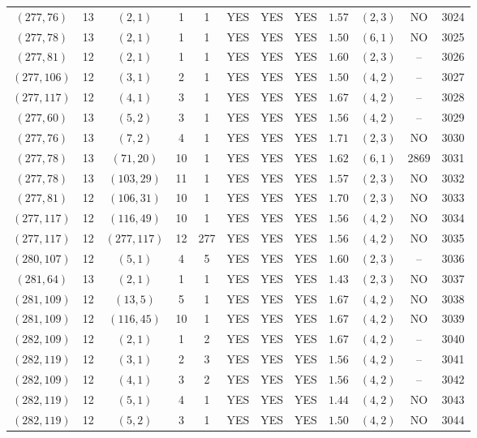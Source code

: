 \begin{longtable}{|c|c|c|c|c|c|c|c|c|c|c|c|}
$(277,76)$ & 13 & $(2,1)$ & 1 & 1 & YES & YES & YES & $1.57$ & $(2,3)$ & NO & 3024\\
$(277,78)$ & 13 & $(2,1)$ & 1 & 1 & YES & YES & YES & $1.50$ & $(6,1)$ & NO & 3025\\
$(277,81)$ & 12 & $(2,1)$ & 1 & 1 & YES & YES & YES & $1.60$ & $(2,3)$ & -- & 3026\\
$(277,106)$ & 12 & $(3,1)$ & 2 & 1 & YES & YES & YES & $1.50$ & $(4,2)$ & -- & 3027\\
$(277,117)$ & 12 & $(4,1)$ & 3 & 1 & YES & YES & YES & $1.67$ & $(4,2)$ & -- & 3028\\
$(277,60)$ & 13 & $(5,2)$ & 3 & 1 & YES & YES & YES & $1.56$ & $(4,2)$ & -- & 3029\\
$(277,76)$ & 13 & $(7,2)$ & 4 & 1 & YES & YES & YES & $1.71$ & $(2,3)$ & NO & 3030\\
$(277,78)$ & 13 & $(71,20)$ & 10 & 1 & YES & YES & YES & $1.62$ & $(6,1)$ & 2869 & 3031\\
$(277,78)$ & 13 & $(103,29)$ & 11 & 1 & YES & YES & YES & $1.57$ & $(2,3)$ & NO & 3032\\
$(277,81)$ & 12 & $(106,31)$ & 10 & 1 & YES & YES & YES & $1.70$ & $(2,3)$ & NO & 3033\\
$(277,117)$ & 12 & $(116,49)$ & 10 & 1 & YES & YES & YES & $1.56$ & $(4,2)$ & NO & 3034\\
$(277,117)$ & 12 & $(277,117)$ & 12 & 277 & YES & YES & YES & $1.56$ & $(4,2)$ & NO & 3035\\
$(280,107)$ & 12 & $(5,1)$ & 4 & 5 & YES & YES & YES & $1.60$ & $(2,3)$ & -- & 3036\\
$(281,64)$ & 13 & $(2,1)$ & 1 & 1 & YES & YES & YES & $1.43$ & $(2,3)$ & NO & 3037\\
$(281,109)$ & 12 & $(13,5)$ & 5 & 1 & YES & YES & YES & $1.67$ & $(4,2)$ & NO & 3038\\
$(281,109)$ & 12 & $(116,45)$ & 10 & 1 & YES & YES & YES & $1.67$ & $(4,2)$ & NO & 3039\\
$(282,109)$ & 12 & $(2,1)$ & 1 & 2 & YES & YES & YES & $1.67$ & $(4,2)$ & -- & 3040\\
$(282,119)$ & 12 & $(3,1)$ & 2 & 3 & YES & YES & YES & $1.56$ & $(4,2)$ & -- & 3041\\
$(282,109)$ & 12 & $(4,1)$ & 3 & 2 & YES & YES & YES & $1.56$ & $(4,2)$ & -- & 3042\\
$(282,119)$ & 12 & $(5,1)$ & 4 & 1 & YES & YES & YES & $1.44$ & $(4,2)$ & NO & 3043\\
$(282,119)$ & 12 & $(5,2)$ & 3 & 1 & YES & YES & YES & $1.50$ & $(4,2)$ & NO & 3044\\

\end{longtable}

